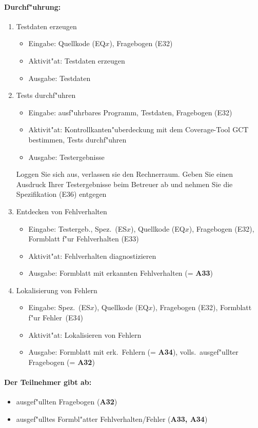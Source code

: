 \paragraph{Durchf"uhrung:} 
\begin{enumerate}
	\item Testdaten erzeugen
	\begin{itemize}
		\item Eingabe: Quellkode (EQ$x$), Fragebogen (E32)
		\item Aktivit"at: Testdaten erzeugen
		\item Ausgabe: Testdaten
	\end{itemize}
	\item Tests durchf"uhren
	\begin{itemize}
		\item Eingabe: ausf"uhrbares Programm, Testdaten, Fragebogen (E32)
		\item Aktivit"at: Kontrollkanten"uberdeckung mit dem Coverage-Tool GCT 
			bestimmen, Tests durchf"uhren
		\item Ausgabe: Testergebnisse
	\end{itemize}
	Loggen Sie sich aus, verlassen sie den Rechnerraum.
	Geben Sie einen Ausdruck Ihrer Testergebnisse beim Betreuer ab und nehmen 
	Sie die Spezifikation (E36) entgegen
	\item Entdecken von Fehlverhalten
	\begin{itemize}
		\item Eingabe: Testergeb., Spez.~(ES$x$), Quellkode (EQ$x$), 
			Fragebogen (E32), Formblatt f"ur Fehlverhalten (E33)
		\item Aktivit"at: Fehlverhalten diagnostizieren
		\item Ausgabe: Formblatt mit erkannten Fehlverhalten (= {\bf A33})
	\end{itemize}
	\item Lokalisierung von Fehlern
	\begin{itemize}
		\item Eingabe: Spez.~(ES$x$), Quellkode (EQ$x$), 
			Fragebogen (E32), Formblatt f"ur Fehler~(E34)
		\item Aktivit"at: Lokalisieren von Fehlern
		\item Ausgabe: Formblatt mit erk.~Fehlern (= {\bf A34}), 
			volls.~ausgef"ullter Fragebogen (= {\bf A32})
	\end{itemize}
\end{enumerate}

\paragraph{Der Teilnehmer gibt ab:}  
\begin{itemize}
	\item ausgef"ullten Fragebogen ({\bf A32})
	\item ausgef"ulltes Formbl"atter Fehlverhalten/Fehler ({\bf A33, A34})
\end{itemize}

